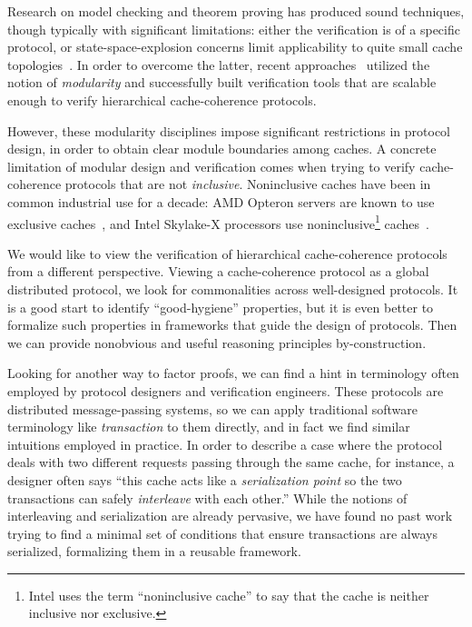 \documentclass[sigplan,10pt,review,anonymous,screen]{acmart}\settopmatter{printfolios=true,printccs=false,printacmref=false}
\begin{document}
Research on model checking and theorem proving has produced sound techniques, though typically with significant limitations:
either the verification is of a specific protocol, or state-space-explosion concerns limit applicability to quite small cache topologies~\cite{Komuravelli:2014,Murali:2015,Banks:2017,Oswald:2018}.
In order to overcome the latter, recent approaches~\cite{Chen:2008,Chen:2010,McMillan:2016,Opeoluwa:2016,Opeoluwa:2017,Oswald:2020} utilized the notion of \emph{modularity} and successfully built verification tools that are scalable enough to verify hierarchical cache-coherence protocols.

However, these modularity disciplines impose significant restrictions in protocol design, in order to obtain clear module boundaries among caches.
A concrete limitation of modular design and verification comes when trying to verify cache-coherence protocols that are not \emph{inclusive}.
Noninclusive caches have been in common industrial use for a decade: AMD Opteron servers are known to use exclusive caches~\cite{Irazoqui:2016}, and Intel Skylake-X processors use noninclusive\footnote{Intel uses the term ``noninclusive cache'' to say that the cache is neither inclusive nor exclusive.} caches~\cite{intel-non-inclusive,Zhao:2010,Yan:2019}.

We would like to view the verification of hierarchical cache-coherence protocols from a different perspective.
Viewing a cache-coherence protocol as a global distributed protocol, we look for commonalities across well-designed protocols.
It is a good start to identify ``good-hygiene'' properties, but it is even better to formalize such properties in frameworks that guide the design of protocols.
Then we can provide nonobvious and useful reasoning principles by-construction.

Looking for another way to factor proofs, we can find a hint in terminology often employed by protocol designers and verification engineers.
These protocols are distributed message-passing systems, so we can apply traditional software terminology like \emph{transaction} to them directly, and in fact we find similar intuitions employed in practice.
In order to describe a case where the protocol deals with two different requests passing through the same cache, for instance, a designer often says ``this cache acts like a \emph{serialization point} so the two transactions can safely \emph{interleave} with each other.''
While the notions of interleaving and serialization are already pervasive, we have found no past work trying to find a minimal set of conditions that ensure transactions are always serialized, formalizing them in a reusable framework.
\end{document}
